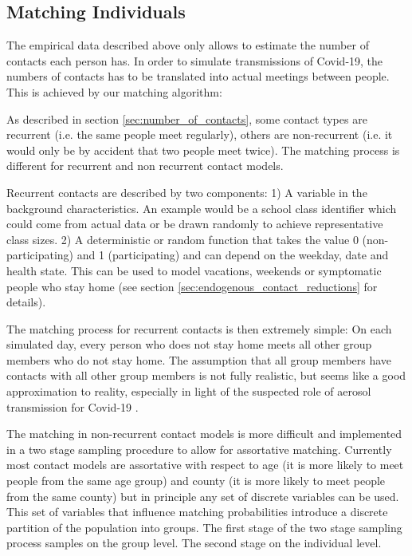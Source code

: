 \subsection{Matching Individuals}
\label{sec:matching}

The empirical data described above only allows to estimate the number of contacts each
person has. In order to simulate transmissions of Covid-19, the numbers of contacts has
to be translated into actual meetings between people. This is achieved by our matching
algorithm:

As described in section \ref{sec:number_of_contacts}, some contact types are recurrent
(i.e. the same people meet regularly), others are non-recurrent (i.e. it would only be
by accident that two people meet twice). The matching process is different for recurrent
and non recurrent contact models.

Recurrent contacts are described by two components: 1) A variable in the background
characteristics. An example would be a school class identifier which could come from
actual data or be drawn randomly to achieve representative class sizes.
2) A deterministic or random function that takes the value 0 (non-participating) and 1
(participating) and can depend on the weekday, date and health state. This can be used
to model vacations, weekends or symptomatic people who stay home (see section
\ref{sec:endogenous_contact_reductions} for details).

The matching process for recurrent contacts is then extremely simple: On each simulated
day, every person who does not stay home meets all other group members who do not stay
home. The assumption that all group members have contacts with all other group members
is not fully realistic, but seems like a good approximation to reality, especially in
light of the suspected role of aerosol transmission for Covid-19 \citep{Morawska2020,
Anderson2020}.

The matching in non-recurrent contact models is more difficult and implemented in a two
stage sampling procedure to allow for assortative matching. Currently most contact
models are assortative with respect to age (it is more likely to meet people from the
same age group) and county (it is more likely to meet people from the same county) but
in principle any set of discrete variables can be used. This set of variables that
influence matching probabilities introduce a discrete partition of the population into
groups. The first stage of the two stage sampling process samples on the group level.
The second stage on the individual level.

